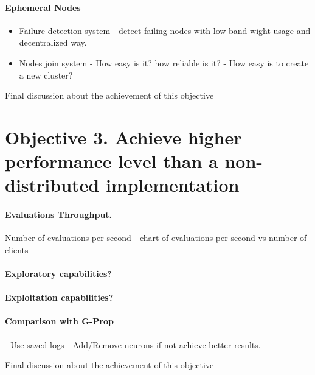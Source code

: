 \paragraph*{Ephemeral Nodes}
\begin{itemize}
	\item Failure detection system - detect failing nodes with low band-wight usage and decentralized way.
	\item Nodes join system - How easy is it? how reliable is it? - How easy is to create a new cluster?
\end{itemize}

Final discussion about the achievement of this objective



\section{Objective 3. Achieve higher performance level than a non-distributed implementation}

\paragraph*{Evaluations Throughput.} Number of evaluations per second - chart of evaluations per second vs number of clients
\paragraph*{Exploratory capabilities?}
\paragraph*{Exploitation capabilities?}
\paragraph*{Comparison with G-Prop} - Use saved logs - Add/Remove neurons if not achieve better results.

Final discussion about the achievement of this objective